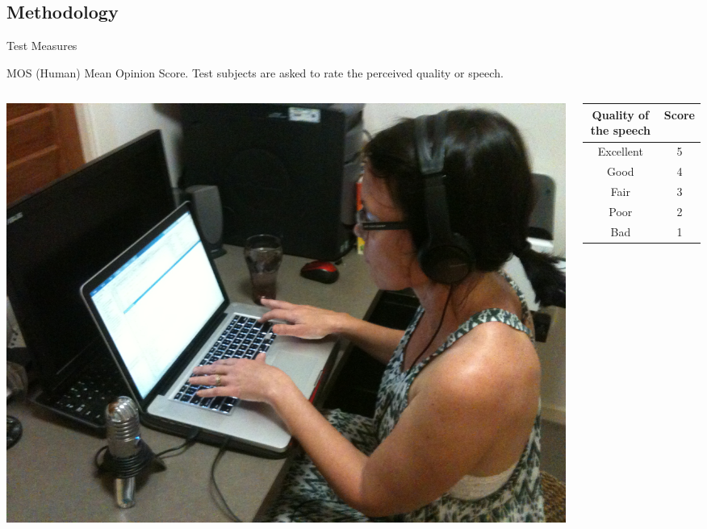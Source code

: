 \subsection{Methodology}
{\nologo
\begin{frame}{Test Measures}
	\begin{block}{MOS (Human)}
		Mean Opinion Score. Test subjects are asked to rate the perceived quality or speech.

		\begin{columns}[c]
		\begin{column}{0.4\textwidth}
			\includegraphics[width=\textwidth,height=0.8\textheight,keepaspectratio]{fig/mos.jpg}
		\end{column}
		\begin{column}{0.5\textwidth}
			\begin{tabular}{|c|c|}
			\hline 
			Quality of the speech & Score\tabularnewline
			\hline 
			\hline 
			Excellent & 5\tabularnewline
			\hline 
			Good & 4\tabularnewline
			\hline 
			Fair & 3\tabularnewline
			\hline 
			Poor & 2\tabularnewline
			\hline 
			Bad & 1\tabularnewline
			\hline 
			\end{tabular}
		\end{column}
		\end{columns}
	\end{block}
\end{frame}
}
